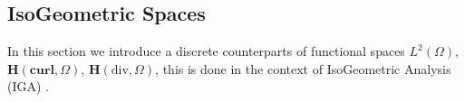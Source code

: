 %
%
%
%
\subsection{IsoGeometric Spaces}\label{subsec-IGA}
In this section we introduce a discrete counterparts of functional spaces $L^2(\Omega)$, $\bm{H}(\textbf{curl},\Omega)$, $\bm{H}(\text{div},\Omega)$, this is done in the context of IsoGeometric Analysis (IGA) \cite{bazilevs2006isogeometric,buffa2011isogeometric,cottrell2009isogeometric,da2014mathematical,hughes2005isogeometric}. 

